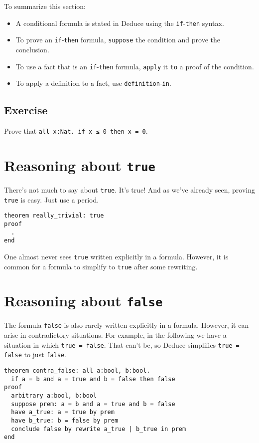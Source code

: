 \documentclass[12pt]{article}
\begin{document}
To summarize this section:
\begin{itemize}
\item A conditional formula is stated in Deduce using the
  \texttt{if}-\texttt{then} syntax.
\item To prove an \texttt{if}-\texttt{then} formula, \texttt{suppose}
  the condition and prove the conclusion.
\item To use a fact that is an \texttt{if}-\texttt{then} formula,
  \texttt{apply} it \texttt{to} a proof of the condition.
\item To apply a definition to a fact, use
  \texttt{definition}-\texttt{in}.
\end{itemize}

\subsection*{Exercise}

Prove that \texttt{all x:Nat. if x ≤ 0 then x = 0}.

\pagebreak

\section{Reasoning about \texttt{true}}
\label{sec:true}

There's not much to say about \texttt{true}. It's true!  And as we've
already seen, proving \texttt{true} is easy. Just use a period.

\begin{verbatim}
theorem really_trivial: true
proof
  .
end
\end{verbatim}

\noindent One almost never sees \texttt{true} written explicitly in a
formula. However, it is common for a formula to simplify to
\texttt{true} after some rewriting.

\pagebreak

\section{Reasoning about \texttt{false}}
\label{sec:false}

The formula \texttt{false} is also rarely written explicitly in a
formula.  However, it can arise in contradictory situations. For
example, in the following we have a situation in which \texttt{true = false}.
That can't be, so Deduce simplifies \texttt{true = false}
to just \texttt{false}.

\begin{verbatim}
theorem contra_false: all a:bool, b:bool.
  if a = b and a = true and b = false then false
proof
  arbitrary a:bool, b:bool
  suppose prem: a = b and a = true and b = false
  have a_true: a = true by prem
  have b_true: b = false by prem
  conclude false by rewrite a_true | b_true in prem
end
\end{verbatim}
\end{document}
